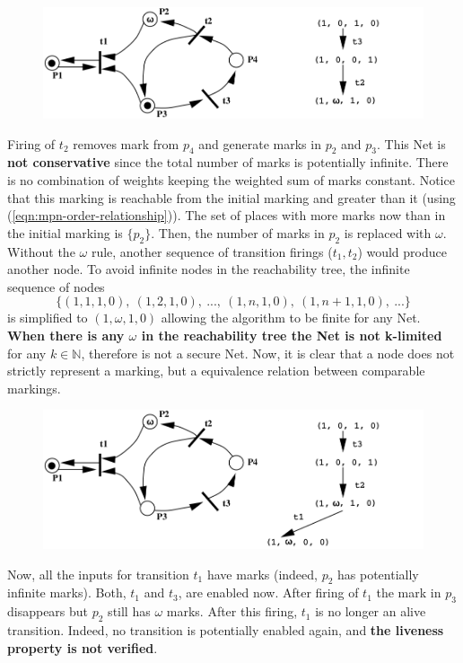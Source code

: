 \documentclass[12pt,english]{article} %
\begin{document}
\begin{figure}[H]
    \centering
    \includegraphics[scale=0.475]{img/petri-net/reachability-tree-example/reachability-tree-step3.png}
\end{figure}
Firing of $t_2$ removes mark from $p_4$ and generate marks in $p_2$ and $p_3$.
This Net is \textbf{not conservative} since the total number of marks is potentially infinite.
There is no combination of weights keeping the weighted sum of marks constant.
Notice that this marking is reachable from the initial marking and greater than it (using (\ref{eqn:mpn-order-relationship})).
The set of places with more marks now than in the initial marking is $\{p_2\}$.
Then, the number of marks in $p_2$ is replaced with $\omega$.
Without the $\omega$ rule, another sequence of transition firings ($t_1,t_2$) would produce another node.
To avoid infinite nodes in the reachability tree, the infinite sequence of nodes
$$\{(1,1,1,0),\ (1,2,1,0),\ ...,\ (1,n,1,0),\ (1,n+1,1,0),\ ...\}$$
is simplified to $(1,\omega,1,0)$ allowing the algorithm to be finite for any Net.
\textbf{When there is any $\omega$ in the reachability tree the Net is not k-limited} for any $k\in\mathbb{N}$, therefore is not a secure Net.
Now, it is clear that a node does not strictly represent a marking, but a equivalence relation between comparable markings.

\begin{figure}[H]
    \centering
    \includegraphics[scale=0.45]{img/petri-net/reachability-tree-example/reachability-tree-step4.png}
\end{figure}
Now, all the inputs for transition $t_1$ have marks (indeed, $p_2$ has potentially infinite marks).
Both, $t_1$ and $t_3$, are enabled now.
After firing of $t_1$ the mark in $p_3$ disappears but $p_2$ still has $\omega$ marks.
After this firing, $t_1$ is no longer an alive transition.
Indeed, no transition is potentially enabled again, and \textbf{the liveness property is not verified}.
\end{document}
